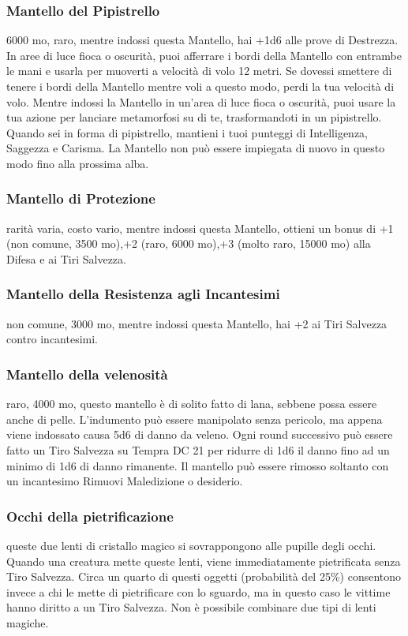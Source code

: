 \begin{multicols}{2}
	\subsubsection*{Mantello del Pipistrello}
	6000 mo, raro, mentre indossi questa Mantello, hai +1d6 alle prove di Destrezza. In aree di luce fioca o oscurità, puoi afferrare i bordi della Mantello con entrambe le mani e usarla per muoverti a velocità di volo 12 metri. Se dovessi smettere di tenere i bordi della Mantello mentre voli a questo modo, perdi la tua velocità di volo. Mentre indossi la Mantello in un'area di luce fioca o oscurità, puoi usare la tua azione per lanciare metamorfosi su di te, trasformandoti in un pipistrello. Quando sei in forma di pipistrello, mantieni i tuoi punteggi di Intelligenza, Saggezza e Carisma. La Mantello non può essere impiegata di nuovo in questo modo fino alla prossima alba.

	\subsubsection*{Mantello di Protezione}
	rarità varia, costo vario, mentre indossi questa Mantello, ottieni un bonus di +1 (non comune, 3500 mo),+2 (raro, 6000 mo),+3 (molto raro, 15000 mo) alla Difesa e ai Tiri Salvezza.

	\subsubsection*{Mantello della Resistenza agli Incantesimi}
	non comune, 3000 mo, mentre indossi questa Mantello, hai +2 ai Tiri Salvezza contro incantesimi.


	\subsubsection*{Mantello della velenosità}
	raro, 4000 mo, questo mantello è di solito fatto di lana, sebbene possa essere anche di pelle. L’indumento può essere manipolato senza pericolo, ma appena viene indossato causa 5d6 di danno da veleno. Ogni round successivo può essere fatto un Tiro Salvezza su Tempra DC 21 per ridurre di 1d6 il danno fino ad un minimo di 1d6 di danno rimanente. Il mantello può essere rimosso soltanto con un incantesimo Rimuovi Maledizione o desiderio.

	\subsubsection*{Occhi della pietrificazione}
	queste due lenti di cristallo magico si sovrappongono alle pupille degli occhi. Quando una creatura mette queste lenti, viene immediatamente pietrificata senza Tiro Salvezza. Circa un quarto di questi oggetti (probabilità del 25\%) consentono invece a chi le mette di pietrificare con lo sguardo, ma in questo caso le vittime hanno diritto a un Tiro Salvezza. Non è possibile combinare due tipi di lenti magiche.


\end{multicols}

